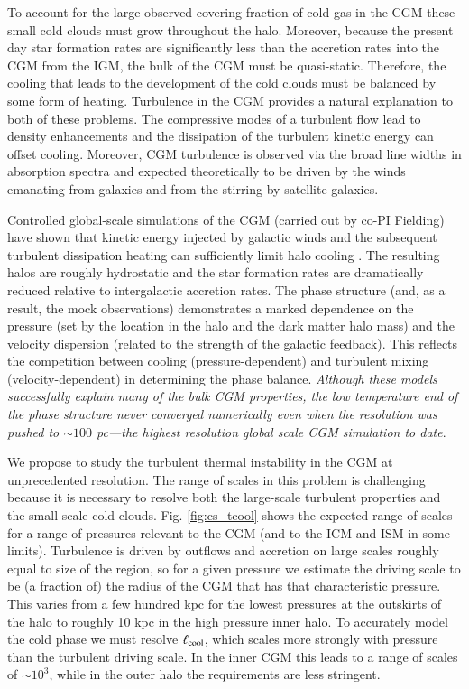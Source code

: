 \documentclass[11pt,letterpaper,english]{article}
\begin{document}
To account for the large observed covering fraction of cold gas in the CGM these small cold clouds must grow throughout the halo. Moreover, because the present day star formation rates are significantly less than the accretion rates into the CGM from the IGM, the bulk of the CGM must be quasi-static. Therefore, the cooling that leads to the development of the cold clouds must be balanced by some form of heating. Turbulence in the CGM provides a natural explanation to both of these problems. The compressive modes of a turbulent flow lead to density enhancements and the dissipation of the turbulent kinetic energy can offset cooling. Moreover, CGM turbulence is observed via the broad line widths in  absorption spectra and expected theoretically to be driven by the winds emanating from galaxies and from the stirring by satellite galaxies. 

Controlled global-scale simulations of the CGM (carried out by co-PI Fielding) have shown that kinetic energy injected by galactic winds and the subsequent turbulent dissipation heating can sufficiently limit halo cooling \cite{Fielding17}. 
The resulting halos are roughly hydrostatic and the star formation rates are dramatically reduced relative to intergalactic accretion rates. 
The phase structure (and, as a result, the mock observations) demonstrates a marked dependence on the pressure (set by the location in the halo and the dark matter halo mass) and the velocity dispersion (related to the strength of the galactic feedback). 
This reflects the competition between cooling (pressure-dependent) and turbulent mixing (velocity-dependent) in determining the phase balance.
{\em Although these models successfully explain many of the bulk CGM properties, the low temperature end of the phase structure never converged numerically even when the resolution was pushed to $\sim 100$ pc---the highest resolution global scale CGM simulation to date}. 

We propose to study the turbulent thermal instability in the CGM at unprecedented resolution. The range of scales in this problem is challenging because it is necessary to resolve both the large-scale turbulent properties and the small-scale cold clouds. Fig. \ref{fig:cs_tcool} shows the expected range of scales for a range of pressures relevant to the CGM (and to the ICM and ISM in some limits). Turbulence is driven by outflows and accretion on large scales roughly equal to size of the region, so for a given pressure we estimate the driving scale to be (a fraction of) the radius of the CGM that has that characteristic pressure. This varies from a few hundred kpc for the lowest pressures at the outskirts of the halo to roughly 10 kpc in the high pressure inner halo. To accurately model the cold phase we must resolve $\ell_{\rm cool}$, which scales more strongly with pressure than the turbulent driving scale. In the inner CGM this leads to a range of scales of $\sim10^3$, while in the outer halo the requirements are less stringent.
\end{document}
